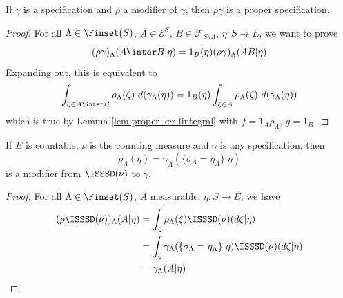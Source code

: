 
\begin{lemma}
    \label{lem:modif-proper}
    \leanok{}

    If $\gamma$ is a specification and $\rho$ a modifier of $\gamma$, then $\rho\gamma$ is a proper specification.
\end{lemma}
\begin{proof}
    \leanok

    For all $\Lambda \in \Finset(S)$, $A \in \mathcal E^S$, $B \in \mathcal{F}_{S\setminus\Lambda}$, $\eta : S \to E$, we want to prove
    $$(\rho\gamma)_\Lambda(A \inter B | \eta) = 1_B(\eta) (\rho\gamma)_\Lambda(A B | \eta)$$
    Expanding out, this is equivalent to
    $$\int_{\zeta \in A \inter B} \rho_\Lambda(\zeta)\ d(\gamma_\Lambda(\eta)) = 1_B(\eta) \int_{\zeta \in A} \rho_\Lambda(\zeta)\ d(\gamma_\Lambda(\eta))$$
    which is true by Lemma \ref{lem:proper-ker-lintegral} with $f = 1_A\rho_\Lambda$, $g = 1_B$.
\end{proof}





\begin{lemma}
    \label{lem:exists-modif-isssd}

    If $E$ is countable, $\nu$ is the counting measure and $\gamma$ is any specification, then
    $$\rho_\Lambda(\eta) = \gamma_\Lambda(\{\sigma_\Lambda = \eta_\Lambda\} | \eta)$$
    is a modifier from $\ISSSD(\nu)$ to $\gamma$.
\end{lemma}
\begin{proof}

    For all $\Lambda \in \Finset(S)$, $A$ measurable, $\eta : S \to E$, we have
    \begin{align}
        (\rho\ISSSD(\nu))_\Lambda(A|\eta)
        & = \int_\zeta \rho_\Lambda(\zeta) \ISSSD(\nu)(d\zeta|\eta) \\
        & = \int_\zeta \gamma_\Lambda(\{\sigma_\Lambda = \eta_\Lambda\} | \eta) \ISSSD(\nu)(d\zeta|\eta) \\
        & = \gamma_\Lambda(A|\eta)
    \end{align}
\end{proof}

